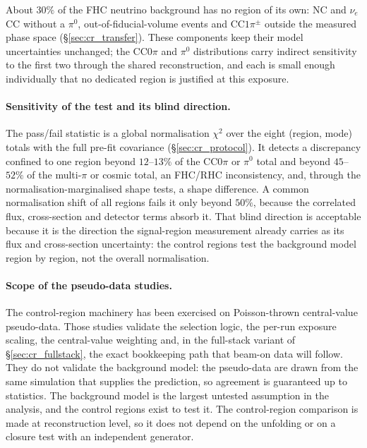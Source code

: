\documentclass[11pt,a4paper]{article}
\begin{document}
About $30\%$ of the FHC neutrino background has no region of its own: NC and
$\nu_e$CC without a $\pi^0$, out-of-fiducial-volume events and CC$1\pi^\pm$ outside the
measured phase space (\S\ref{sec:cr_transfer}). These components keep their model
uncertainties unchanged; the CC$0\pi$ and $\pi^0$ distributions carry indirect
sensitivity to the first two through the shared reconstruction, and each is small
enough individually that no dedicated region is justified at this exposure.

\paragraph{Sensitivity of the test and its blind direction.} The pass/fail statistic is
a global normalisation $\chi^2$ over the eight (region, mode) totals with the full
pre-fit covariance (\S\ref{sec:cr_protocol}). It detects a discrepancy confined to one
region beyond $12$--$13\%$ of the CC$0\pi$ or $\pi^0$ total and beyond $45$--$52\%$ of the
multi-$\pi$ or cosmic total, an FHC/RHC inconsistency, and, through the
normalisation-marginalised shape tests, a shape difference. A common
normalisation shift of all regions fails it only beyond $50\%$, because the correlated
flux, cross-section and detector terms absorb it. That blind direction is acceptable
because it is the direction the signal-region measurement already carries as its flux
and cross-section uncertainty: the control regions test the background model region by
region, not the overall normalisation.

\paragraph{Scope of the pseudo-data studies.}
The control-region machinery has been exercised on Poisson-thrown central-value pseudo-data.
Those studies validate the selection logic, the per-run exposure scaling, the
central-value weighting and, in the full-stack variant of \S\ref{sec:cr_fullstack}, the
exact bookkeeping path that beam-on data will follow. They do not validate the
background model: the pseudo-data are drawn from the same simulation that supplies the
prediction, so agreement is guaranteed up to statistics. The background model is the
largest untested assumption in the analysis, and the control regions exist to test it. The
control-region comparison is made at reconstruction level, so it does not depend on the unfolding or
on a closure test with an independent generator.
\end{document}
